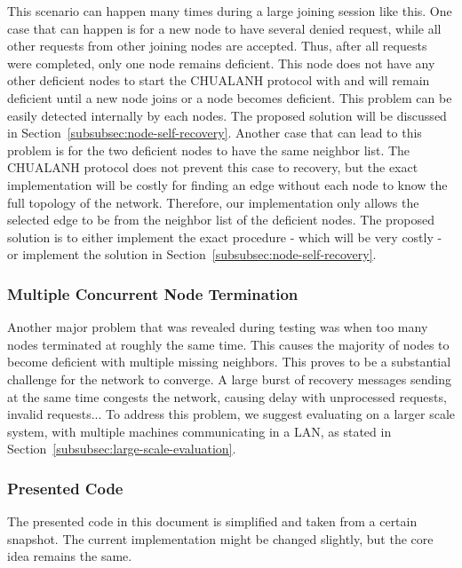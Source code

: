 This scenario can happen many times during a large joining session like this. One case that can happen is for a new
node to have several denied request, while all other requests from other joining nodes are accepted. Thus, after all
requests were completed, only one node remains deficient. This node does not have any other deficient nodes to start
the CHUALANH protocol with and will remain deficient until a new node joins or a node becomes deficient. This problem
can be easily detected internally by each nodes. The proposed solution will be discussed in
Section~\ref{subsubsec:node-self-recovery}. Another case that can lead to this problem is for the two deficient nodes
to have the same neighbor list. The CHUALANH protocol does not prevent this case to recovery, but the exact
implementation will be costly for finding an edge without each node to know the full topology of the network.
Therefore, our implementation only allows the selected edge to be from the neighbor list of the deficient nodes. The
proposed solution is to either implement the exact procedure - which will be very costly - or implement the solution in
Section~\ref{subsubsec:node-self-recovery}.

\subsubsection{Multiple Concurrent Node Termination}
\label{subsubsec:multiple-node-termination}

Another major problem that was revealed during testing was when too many nodes terminated at roughly the same time.
This causes the majority of nodes to become deficient with multiple missing neighbors. This proves to be a substantial
challenge for the network to converge. A large burst of recovery messages sending at the same time congests the
network, causing delay with unprocessed requests, invalid requests... To address this problem, we suggest evaluating on
a larger scale system, with multiple machines communicating in a LAN, as stated in
Section~\ref{subsubsec:large-scale-evaluation}.

\subsubsection{Presented Code}

The presented code in this document is simplified and taken from a certain snapshot. The current implementation might
be changed slightly, but the core idea remains the same.

